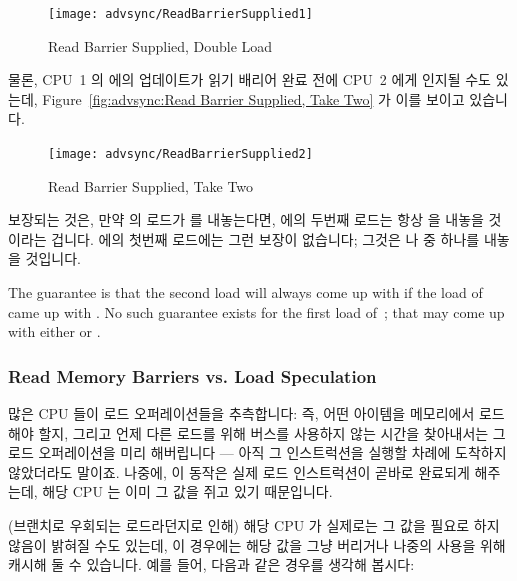 \begin{enumerate}
\begin{figure}[htbp]
\centering
\texttt{[image: advsync/ReadBarrierSupplied1]}
\caption{Read Barrier Supplied, Double Load}
\end{figure}

물론, CPU~1 의  에의 업데이트가 읽기 배리어 완료 전에 CPU~2 에게 인지될
수도 있는데, Figure~\ref{fig:advsync:Read Barrier Supplied, Take Two} 가 이를
보이고 있습니다.

\begin{figure}[htbp]
\centering
\texttt{[image: advsync/ReadBarrierSupplied2]}
\caption{Read Barrier Supplied, Take Two}
\end{figure}

보장되는 것은, 만약  의 로드가  를 내놓는다면,  에의
두번째 로드는 항상  을 내놓을 것이라는 겁니다.
 에의 첫번째 로드에는 그런 보장이 없습니다; 그것은  나
 중 하나를 내놓을 것입니다.
\iffalse

The guarantee is that the second load will always come up with 
if the
load of~ came up with .
No such guarantee exists for the first load
of~; that may come up with either  or .

\subsubsection{Read Memory Barriers vs. Load Speculation}
\label{sec:advsync:Read Memory Barriers vs. Load Speculation}

많은 CPU 들이 로드 오퍼레이션들을 추측합니다: 즉, 어떤 아이템을 메모리에서
로드해야 할지, 그리고 언제 다른 로드를 위해 버스를 사용하지 않는 시간을
찾아내서는 그 로드 오퍼레이션을 미리 해버립니다 --- 아직 그 인스트럭션을 실행할
차례에 도착하지 않았더라도 말이죠.
나중에, 이 동작은 실제 로드 인스트럭션이 곧바로 완료되게 해주는데, 해당 CPU 는
이미 그 값을 쥐고 있기 때문입니다.

(브랜치로 우회되는 로드라던지로 인해) 해당 CPU 가 실제로는 그 값을 필요로 하지
않음이 밝혀질 수도 있는데, 이 경우에는 해당 값을 그냥 버리거나 나중의 사용을
위해 캐시해 둘 수 있습니다.
예를 들어, 다음과 같은 경우를 생각해 봅시다:
\iffalse


\end{enumerate}
